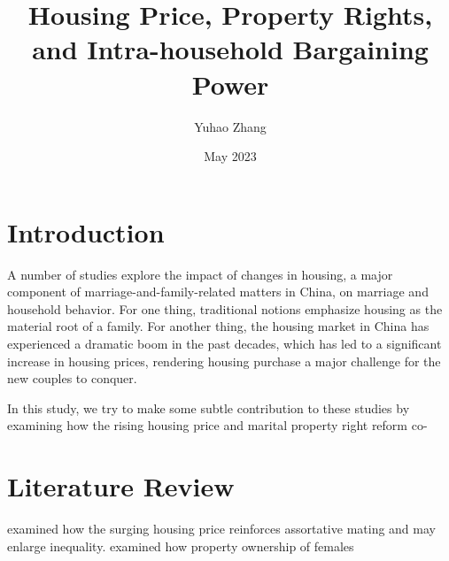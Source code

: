 \documentclass[11pt]{article}
\title{Housing Price, Property Rights, and Intra-household Bargaining Power}
\author{Yuhao Zhang}
\date{May 2023}
\begin{document}
\maketitle
\begin{abstract}
    
\end{abstract}

\section{Introduction}
A number of studies explore the impact of changes in housing, a major component of marriage-and-family-related matters in China, on marriage and household behavior. For one thing, traditional notions emphasize housing as the material root of a family. For another thing, the housing market in China has experienced a dramatic boom in the past decades, which has led to a significant increase in housing prices, rendering housing purchase a major challenge for the new couples to conquer. 

In this study, we try to make some subtle contribution to these studies by examining how the rising housing price and marital property right reform co-

\section{Literature Review}
\citet{SUN2020102492} examined how the surging housing price reinforces assortative mating and may enlarge inequality. \citet{WANG2014192} examined how property ownership of females 





\end{document}
